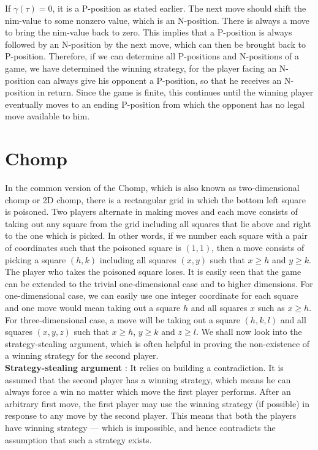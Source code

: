\documentclass[a4paper, 12pt]{article}
\theoremstyle{remark} %
\begin{document}
If $\gamma(\tau)=0$, it is a P-position as stated earlier. The next move should shift the nim-value to some nonzero value, which is an N-position. There is always a move to bring the nim-value back to zero. This implies that a P-position is always followed by an N-position by the next move, which can then be brought back to P-position. Therefore, if we can determine all P-positions and N-positions of a game, we have determined the winning strategy, for the player facing an N-position can always give his opponent a P-position, so that he receives an N-position in return. Since the game is finite, this continues until the winning player eventually moves to an ending P-position from which the opponent has no legal move available to him.

\section{Chomp}
\label{chomp}

In the common version of the Chomp, which is also known as two-dimensional chomp or 2D chomp, there is a rectangular grid in which the bottom left square is poisoned. Two players alternate in making moves and each move consists of taking out any square from the grid including all squares that lie above and right to the one which is picked. In other words, if we number each square with a pair of coordinates such that the poisoned square is $(1,1)$, then a move consists of picking a square $(h,k)$ including all squares $(x,y)$ such that $x \geq h$ and $y \geq k$. The player who takes the poisoned square loses. It is easily seen that the game can be extended to the trivial one-dimensional case and to higher dimensions. For one-dimensional case, we can easily use one integer coordinate for each square and one move would mean taking out a square $h$ and all squares $x$ such as $x \geq h$. For three-dimensional case, a move will be taking out a square $(h, k, l)$ and all squares $(x, y, z)$ such that $x \geq h$, $y \geq k$ and $z \geq l$. We shall now look into the strategy-stealing argument, which is often helpful in proving the non-existence of a winning strategy for the second player.\\

\noindent \textbf{Strategy-stealing argument} : It relies on building a contradiction. It is assumed that the second player has a winning strategy, which means he can always force a win no matter which move the first player performs. After an arbitrary first move, the first player may use the winning strategy (if possible) in response to any move by the second player. This means that both the players have winning strategy --- which is impossible, and hence contradicts the assumption that such a strategy exists.\\
\end{document}
